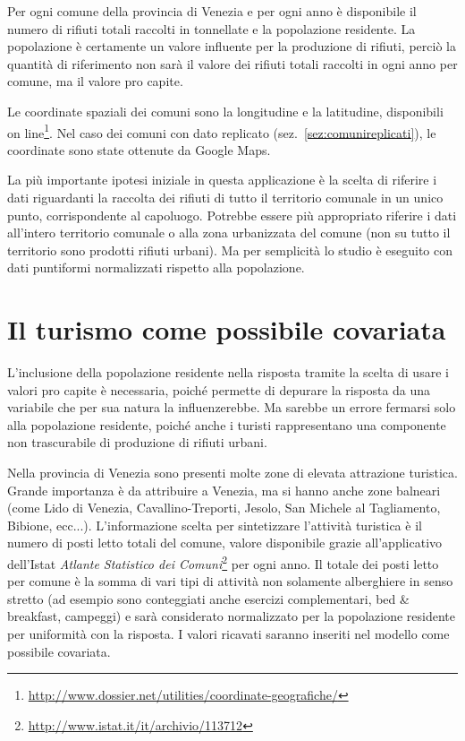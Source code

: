 \documentclass[a4paper,11pt,twoside,openright]{book}							%
\begin{document}
Per ogni comune della provincia di Venezia e per ogni anno è disponibile il numero di rifiuti totali raccolti in tonnellate e la popolazione residente. La popolazione è certamente un valore influente per la produzione di rifiuti, perciò la quantità di riferimento non sarà il valore dei rifiuti totali raccolti in ogni anno per comune, ma il valore pro capite.

Le coordinate spaziali dei comuni sono la longitudine e la latitudine, disponibili on line\footnote{\href{http://www.dossier.net/utilities/coordinate-geografiche/}{http://www.dossier.net/utilities/coordinate-geografiche/}}. Nel caso dei comuni con dato replicato (sez.~\ref{sez:comunireplicati}), le coordinate sono state ottenute da Google Maps.

La più importante ipotesi iniziale in questa applicazione è la scelta di riferire i dati riguardanti la raccolta dei rifiuti di tutto il territorio comunale in un unico punto, corrispondente al capoluogo. Potrebbe essere più appropriato riferire i dati all'intero territorio comunale o alla zona urbanizzata del comune (non su tutto il territorio sono prodotti rifiuti urbani). Ma per semplicità lo studio è eseguito con dati puntiformi normalizzati rispetto alla popolazione. 

\section{Il turismo come possibile covariata}

L'inclusione della popolazione residente nella risposta tramite la scelta di usare i valori pro capite è necessaria, poiché permette di depurare la risposta da una variabile che per sua natura la influenzerebbe. Ma sarebbe un errore fermarsi solo alla popolazione residente, poiché anche i turisti rappresentano una componente non trascurabile di produzione di rifiuti urbani.

Nella provincia di Venezia sono presenti molte zone di elevata attrazione turistica. Grande importanza è da attribuire a Venezia, ma si hanno anche zone balneari (come Lido di Venezia, Cavallino-Treporti, Jesolo, San Michele al Tagliamento, Bibione, ecc...). L'informazione scelta per sintetizzare l'attività turistica è il numero di posti letto totali del comune, valore disponibile grazie all'applicativo dell'Istat \textit{Atlante Statistico dei Comuni}\footnote{\href{http://www.istat.it/it/archivio/113712}{http://www.istat.it/it/archivio/113712}} per ogni anno. Il totale dei posti letto per comune è la somma di vari tipi di attività non solamente alberghiere in senso stretto (ad esempio sono conteggiati anche esercizi complementari, bed \& breakfast, campeggi) e sarà considerato normalizzato per la popolazione residente per uniformità con la risposta. I valori ricavati saranno inseriti nel modello come possibile covariata.
\end{document}
